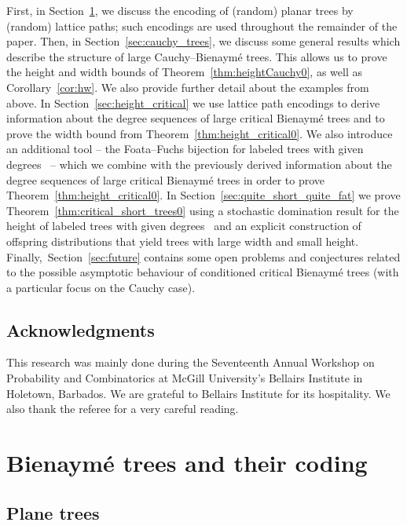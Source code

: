 \documentclass[10pt]{amsart}
\theoremstyle{definition}\newtheorem{defi}[theo]{Definition}\newtheorem{rema}[theo]{Remark}\newtheorem{exam}[theo]{Example}\newtheorem{exem}[theo]{Example}\newtheorem{nota}[theo]{Notation}
\begin{document}
First, in Section~\ref{sec:trees}, we discuss the encoding of (random) planar trees by (random) lattice paths; such encodings are used throughout the remainder of the paper. Then, in Section~\ref{sec:cauchy_trees}, we discuss some general results which describe the structure of large Cauchy--Bienaymé trees. This allows us to prove the height and width bounds of Theorem~\ref{thm:heightCauchy0}, as well as Corollary~\ref{cor:hw}. We also provide further detail about the examples from above. In Section~\ref{sec:height_critical} we use lattice path encodings to derive information about the degree sequences of large critical Bienaymé trees and to prove the width bound from Theorem~\ref{thm:height_critical0}. We also introduce an additional tool -- the Foata--Fuchs bijection for labeled trees with given degrees~\cite{cayley_us,FoataFuchs} -- which we combine with the previously derived information about the degree sequences of large critical Bienaymé trees in order to prove Theorem~\ref{thm:height_critical0}. {In Section~\ref{sec:quite_short_quite_fat} we prove Theorem~\ref{thm:critical_short_trees0} using a stochastic domination result for the height of labeled trees with given degrees~\cite{AD22} and an explicit construction of offspring distributions that yield trees with large width and small height.} Finally,~Section~\ref{sec:future} contains some open problems and conjectures related to the possible asymptotic behaviour of conditioned critical Bienaymé trees (with a particular focus on the Cauchy case).

\subsection*{Acknowledgments}

This research was mainly done during the Seventeenth Annual Workshop on Probability and Combinatorics at McGill University’s Bellairs Institute in Holetown, Barbados. We are grateful to Bellairs Institute for its hospitality. We also thank the referee for a very careful reading.


\section{Bienaymé trees and their coding}\label{sec:trees}

\subsection{Plane trees}\label{sssec:planetrees}
\end{document}
